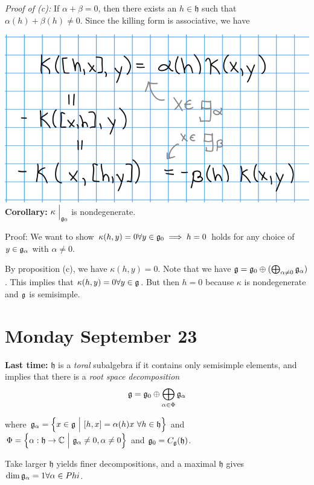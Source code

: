 \emph{Proof of (c):} If \(\alpha + \beta = 0\), then there exists an
\(h\in \mathfrak h\) such that \(\alpha(h) + \beta(h) \neq 0\). Since
the killing form is associative, we have

\includegraphics{figures/2019-09-20-09:54.png}\\

\textbf{Corollary:} \(\kappa\mathrel{\Big|}_{{\mathfrak{g}}_0}\) is nondegenerate.

Proof: We want to show
\(\kappa(h, y) = 0 \forall y\in{\mathfrak{g}}_0 \implies h = 0\) holds for any
choice of \(y\in {\mathfrak{g}}_\alpha\) with \(\alpha \neq 0\).

By proposition (c), we have \(\kappa(h, y) = 0\). Note that we have
\({\mathfrak{g}} = {\mathfrak{g}}_0 \oplus (\bigoplus_{\alpha\neq 0} {\mathfrak{g}}_\alpha)\). This
implies that \(\kappa(h, y) = 0 \forall y\in {\mathfrak{g}}\). But then \(h = 0\)
because \(\kappa\) is nondegenerate and \({\mathfrak{g}}\) is semisimple.

\hypertarget{monday-september-23}{%
\section{Monday September 23}\label{monday-september-23}}

\textbf{Last time:} \(\mathfrak{h}\) is a \emph{toral} subalgebra if it
contains only semisimple elements, and implies that there is a
\emph{root space decomposition} \[
{\mathfrak{g}} = \mathfrak g_0 \oplus \bigoplus_{\alpha \in \Phi} {\mathfrak{g}}_\alpha
\]

where
\({\mathfrak{g}}_\alpha = \left\{{x\in{\mathfrak{g}} {~\mathrel{\Big|}~} [h, x] = \alpha(h)x ~\forall h\in\mathfrak h}\right\}\)
and
\(\Phi = \left\{{\alpha: \mathfrak h \to {\mathbb{C}} {~\mathrel{\Big|}~} {\mathfrak{g}}_\alpha\neq 0, \alpha \neq 0}\right\}\)
and \({\mathfrak{g}}_0 = C_{\mathfrak{g}}(\mathfrak h)\).

Take larger \(\mathfrak h\) yields finer decompositions, and a maximal
\(\mathfrak h\) gives \(\dim {\mathfrak{g}}_\alpha = 1 \forall \alpha \in Phi\).

